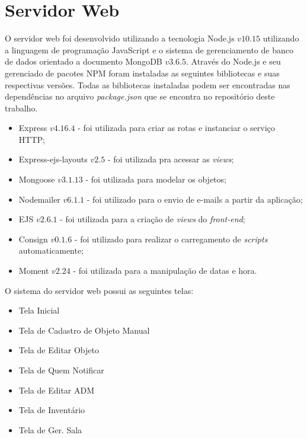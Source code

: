 \section{Servidor Web}

O servidor web foi desenvolvido utilizando a tecnologia Node.js $v10.15$ utilizando a linguagem de programação JavaScript e o sistema de gerenciamento de banco de dados orientado a documento MongoDB $v3.6.5$. Através do Node.js e seu gerenciado de pacotes NPM foram instaladas as seguintes bibliotecas e suas respectivas versões. Todas as bibliotecas instaladas podem ser encontradas nas dependências no arquivo \textit{package.json} que se encontra no repositório deste trabalho. 

\begin{itemize}
    \item Express $v4.16.4$ - foi utilizada para criar as rotas e instanciar o serviço HTTP;
    \item Express-ejs-layouts $v2.5$ - foi utilizada pra acessar as \textit{views}; 
    \item Mongoose $v3.1.13$ - foi utilizada para modelar os objetos;
    \item Nodemailer $v6.1.1$ - foi utilizado para o envio de e-mails a partir da aplicação;
    \item EJS $v2.6.1$ - foi utilizada para a criação de \textit{views} do \textit{front-end};
    \item Consign $v0.1.6$ - foi utilizado para realizar o carregamento de \textit{scripts} automaticamente;
    \item Moment $v2.24$ - foi utilizada para a manipulação de datas e hora.
\end{itemize}





\par 
O sistema do servidor web possui as seguintes telas: 
\begin{itemize}
    \item Tela Inicial
    \item Tela de Cadastro de Objeto Manual
    \item Tela de Editar Objeto
    \item Tela de Quem Notificar
    \item Tela de Editar ADM
    \item Tela de Inventário
    \item Tela de Ger. Sala
\end{itemize}    

